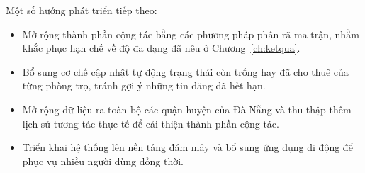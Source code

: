 Một số hướng phát triển tiếp theo:
\begin{itemize}[leftmargin=1.6em, itemsep=2pt]
  \item Mở rộng thành phần cộng tác bằng các phương pháp phân rã ma trận,
        nhằm khắc phục hạn chế về độ đa dạng đã nêu ở Chương~\ref{ch:ketqua}.
  \item Bổ sung cơ chế cập nhật tự động trạng thái còn trống hay đã cho
        thuê của từng phòng trọ, tránh gợi ý những tin đăng đã hết hạn.
  \item Mở rộng dữ liệu ra toàn bộ các quận huyện của Đà Nẵng và thu thập
        thêm lịch sử tương tác thực tế để cải thiện thành phần cộng tác.
  \item Triển khai hệ thống lên nền tảng đám mây và bổ sung ứng dụng di
        động để phục vụ nhiều người dùng đồng thời.
\end{itemize}
